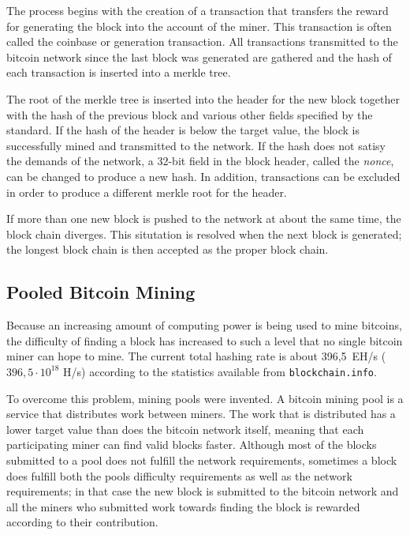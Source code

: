 The process begins with the creation of a transaction that transfers the reward for generating the block
into the account of the miner. This transaction is often called the coinbase or generation transaction.
All transactions transmitted to the bitcoin network since the last block was generated are gathered and
the hash of each transaction is inserted into a merkle tree.

The root of the merkle tree is inserted into the header for the new block together with the hash of the
previous block and various other fields specified by the standard. If the hash of the header is below the
target value, the block is successfully mined and transmitted to the network. If the hash does not satisy
the demands of the network, a 32-bit field in the block header, called the \textit{nonce}, can be changed
to produce a new hash. In addition, transactions can be excluded in order to produce a different merkle
root for the header.

If more than one new block is pushed to the network at about the same time, the block chain diverges.
This situtation is resolved when the next block is generated; the longest block chain is then accepted
as the proper block chain. \cite{bitcoin}

\subsection{Pooled Bitcoin Mining}

Because an increasing amount of computing power is being used to mine bitcoins, the difficulty of finding
a block has increased to such a level that no single bitcoin miner can hope to mine. The current total
hashing rate is about 396,5~EH/s ($396,5\cdot 10^{18}$ H/s) according to the statistics available from
\texttt{blockchain.info}.

To overcome this problem, mining pools were invented. A bitcoin mining pool is a service that distributes
work between miners. The work that is distributed has a lower target value than does the bitcoin network
itself, meaning that each participating miner can find valid blocks faster. Although most of the blocks
submitted to a pool does not fulfill the network requirements, sometimes a block does fulfill both the
pools difficulty requirements as well as the network requirements; in that case the new block is
submitted to the bitcoin network and all the miners who submitted work towards finding the block
is rewarded according to their contribution.

